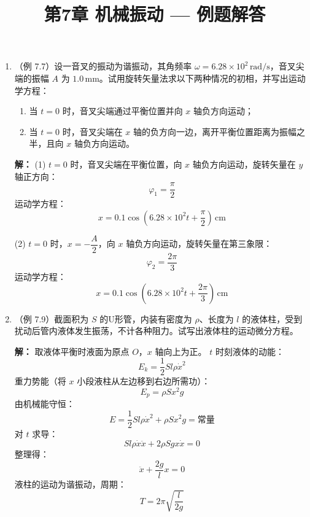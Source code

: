 \documentclass{ctexart}
\title{\textbf{第7章 机械振动} --- 例题解答}
\author{}
\date{}
\begin{document}
\maketitle

\begin{enumerate}

\item（例 7.7）设一音叉的振动为谐振动，其角频率 $\omega = 6.28 \times 10^{2}\,\text{rad/s}$，音叉尖端的振幅 $A$ 为 $1.0\,\text{mm}$。试用旋转矢量法求以下两种情况的初相，并写出运动学方程：
\begin{enumerate}
  \item 当 $t = 0$ 时，音叉尖端通过平衡位置并向 $x$ 轴负方向运动；
  \item 当 $t = 0$ 时，音叉尖端在 $x$ 轴的负方向一边，离开平衡位置距离为振幅之半，且向 $x$ 轴负方向运动。
\end{enumerate}

\textbf{解：}
(1) $t = 0$ 时，音叉尖端在平衡位置，向 $x$ 轴负方向运动，旋转矢量在 $y$ 轴正方向：
\[
\varphi_1 = \frac{\pi}{2}
\]
运动学方程：
\[
x = 0.1\cos\left(6.28\times10^{2}t + \frac{\pi}{2}\right)\,\text{cm}
\]

(2) $t = 0$ 时，$x = -\dfrac{A}{2}$，向 $x$ 轴负方向运动，旋转矢量在第三象限：
\[
\varphi_2 = \frac{2\pi}{3}
\]
运动学方程：
\[
x = 0.1\cos\left(6.28\times10^{2}t + \frac{2\pi}{3}\right)\,\text{cm}
\]

\item（例 7.9）截面积为 $S$ 的U形管，内装有密度为 $\rho$、长度为 $l$ 的液体柱，受到扰动后管内液体发生振荡，不计各种阻力。试写出液体柱的运动微分方程。

\textbf{解：} 取液体平衡时液面为原点 $O$，$x$ 轴向上为正。
$t$ 时刻液体的动能：
\[
E_k = \frac12 Sl\rho \dot{x}^{2}
\]
重力势能（将 $x$ 小段液柱从左边移到右边所需功）：
\[
E_p = \rho S x^{2} g
\]
由机械能守恒：
\[
E = \frac12 Sl\rho \dot{x}^{2} + \rho S x^{2} g = \text{常量}
\]
对 $t$ 求导：
\[
Sl\rho \dot{x}\ddot{x} + 2\rho S g x\dot{x} = 0
\]
整理得：
\[
\ddot{x} + \frac{2g}{l}x = 0
\]
液柱的运动为谐振动，周期：
\[
T = 2\pi\sqrt{\frac{l}{2g}}
\]

\end{enumerate}
\end{document}

